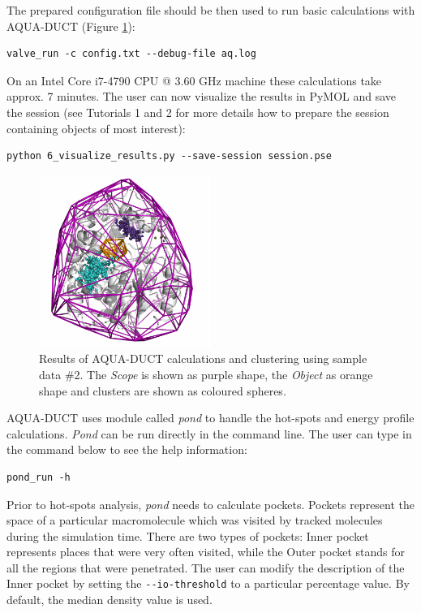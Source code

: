 \documentclass[9pt,tutorial]{livecoms}
\begin{document}
The prepared configuration file should be then used to run basic calculations with AQUA-DUCT (Figure \ref{Tut4.1}):
\begin{lstlisting}
valve_run -c config.txt --debug-file aq.log
\end{lstlisting}
On an Intel Core i7-4790 CPU @ 3.60 GHz machine these calculations take approx. 7 minutes. 
The user can now visualize the results in PyMOL and save the session (see Tutorials 1 and 2 for more details how to prepare the session containing objects of most interest):
\begin{lstlisting}
python 6_visualize_results.py --save-session session.pse
\end{lstlisting}

\begin{figure}[ht!]
\centering
\includegraphics[width=0.5\textwidth]{Tut4.1.png}
\caption{Results of AQUA-DUCT calculations and clustering using sample data \#2. The \emph{Scope} is shown as purple shape, the \emph{Object} as orange shape and clusters are shown as coloured spheres.}
\label{Tut4.1}
\end{figure}

AQUA-DUCT uses module called \textit{pond} to handle the hot-spots and energy profile calculations. \textit{Pond} can be run directly in the command line. The user can type in the command below to see the help information:
\begin{lstlisting}
pond_run -h
\end{lstlisting}
Prior to hot-spots analysis, \emph{pond} needs to calculate pockets. Pockets represent the space of a particular macromolecule which was visited by tracked molecules during the simulation time. There are two types of pockets: Inner pocket represents places that were very often visited, while the Outer pocket stands for all the regions that were  penetrated. The user can modify the description of the Inner pocket by setting the \texttt{-{}-io-threshold} to a particular percentage value. By default, the median density value is used.
\end{document}

